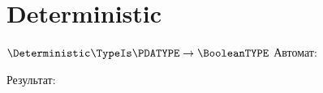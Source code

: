 \section{Deterministic}
\begin{frame}{$\Deterministic\TypeIs\PDATYPE\to\BooleanTYPE$}
	Автомат:

	Результат:

\end{frame}